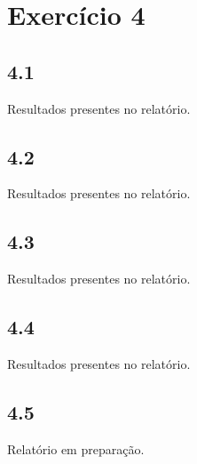 
\section*{\large Exercício 4}
%


\subsection*{4.1} 
%

Resultados presentes no relatório.

\subsection*{4.2} 
%

Resultados presentes no relatório.

\subsection*{4.3} 
%

Resultados presentes no relatório.

\subsection*{4.4} 
%

Resultados presentes no relatório.

\subsection*{4.5} 
%

Relatório em preparação.



